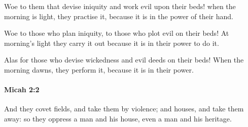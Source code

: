 			\begin{versebox}
					\item[BHS] 
					\item[LXX] 
					\item[ASV] Woe to them that devise iniquity and work evil upon their beds! when the morning is light, they practise it, because it is in the power of their hand.
					\item[NIV] Woe to those who plan iniquity, to those who plot evil on their beds! At morning’s light they carry it out because it is in their power to do it.
					\item[NRSV] Alas for those who devise wickedness and evil deeds on their beds! When the morning dawns, they perform it, because it is in their power.
			\end{versebox}

		\paragraph{Micah 2:2} %
			\label{MICAH-2-2}

			And they covet fields, and take them by violence; and houses, and take them away: so they oppress a man and his house, even a man and his heritage.

